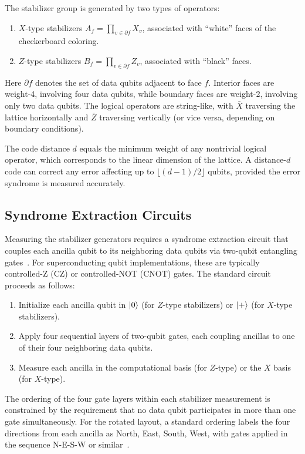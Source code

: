\documentclass[
    reprint,
    aps,
    prx,
    superscriptaddress,
    longbibliography
]{revtex4-2}
\begin{document}
The stabilizer group is generated by two types of operators:
\begin{enumerate}[label=(\roman*)]
    \item $X$-type stabilizers $A_f = \prod_{v \in \partial f} X_v$, associated with ``white'' faces of the checkerboard coloring.
    \item $Z$-type stabilizers $B_f = \prod_{v \in \partial f} Z_v$, associated with ``black'' faces.
\end{enumerate}
Here $\partial f$ denotes the set of data qubits adjacent to face $f$. Interior faces are weight-4, involving four data qubits, while boundary faces are weight-2, involving only two data qubits. The logical operators are string-like, with $\bar{X}$ traversing the lattice horizontally and $\bar{Z}$ traversing vertically (or vice versa, depending on boundary conditions).

The code distance $d$ equals the minimum weight of any nontrivial logical operator, which corresponds to the linear dimension of the lattice. A distance-$d$ code can correct any error affecting up to $\lfloor(d-1)/2\rfloor$ qubits, provided the error syndrome is measured accurately.

\subsection{Syndrome Extraction Circuits}
\label{subsec:syndrome_extraction}

Measuring the stabilizer generators requires a syndrome extraction circuit that couples each ancilla qubit to its neighboring data qubits via two-qubit entangling gates~\cite{Fowler2012Surface}. For superconducting qubit implementations, these are typically controlled-Z (CZ) or controlled-NOT (CNOT) gates. The standard circuit proceeds as follows:
\begin{enumerate}[label=(\roman*)]
    \item Initialize each ancilla qubit in $\ket{0}$ (for $Z$-type stabilizers) or $\ket{+}$ (for $X$-type stabilizers).
    \item Apply four sequential layers of two-qubit gates, each coupling ancillas to one of their four neighboring data qubits.
    \item Measure each ancilla in the computational basis (for $Z$-type) or the $X$ basis (for $X$-type).
\end{enumerate}

The ordering of the four gate layers within each stabilizer measurement is constrained by the requirement that no data qubit participates in more than one gate simultaneously. For the rotated layout, a standard ordering labels the four directions from each ancilla as North, East, South, West, with gates applied in the sequence N-E-S-W or similar~\cite{Fowler2012Surface, Tomita2014LowDistance}.
\end{document}
